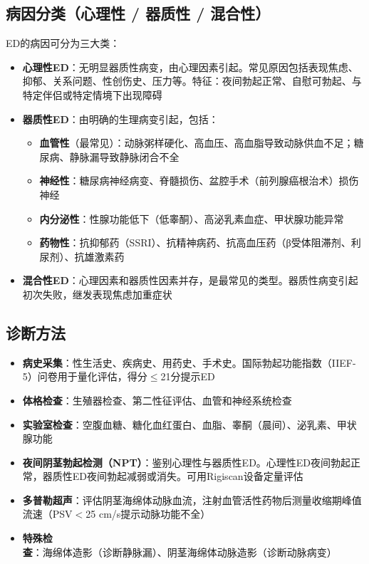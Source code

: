 \subsection{病因分类（心理性 / 器质性 / 混合性）}

ED的病因可分为三大类：

\begin{itemize}[leftmargin=2cm]
	\item \textbf{心理性ED}：无明显器质性病变，由心理因素引起。常见原因包括表现焦虑、抑郁、关系问题、性创伤史、压力等。特征：夜间勃起正常、自慰可勃起、与特定伴侣或特定情境下出现障碍
	\item \textbf{器质性ED}：由明确的生理病变引起，包括：
		\begin{itemize}
		\item \textbf{血管性}（最常见）：动脉粥样硬化、高血压、高血脂导致动脉供血不足；糖尿病、静脉漏导致静脉闭合不全
		\item \textbf{神经性}：糖尿病神经病变、脊髓损伤、盆腔手术（前列腺癌根治术）损伤神经
		\item \textbf{内分泌性}：性腺功能低下（低睾酮）、高泌乳素血症、甲状腺功能异常
		\item \textbf{药物性}：抗抑郁药（SSRI）、抗精神病药、抗高血压药（β受体阻滞剂、利尿剂）、抗雄激素药
		\end{itemize}
	\item \textbf{混合性ED}：心理因素和器质性因素并存，是最常见的类型。器质性病变引起初次失败，继发表现焦虑加重症状
\end{itemize}

\subsection{诊断方法}

\begin{itemize}[leftmargin=2cm]
	\item \textbf{病史采集}：性生活史、疾病史、用药史、手术史。国际勃起功能指数（IIEF-5）问卷用于量化评估，得分$\leq$21分提示ED
	\item \textbf{体格检查}：生殖器检查、第二性征评估、血管和神经系统检查
	\item \textbf{实验室检查}：空腹血糖、糖化血红蛋白、血脂、睾酮（晨间）、泌乳素、甲状腺功能
	\item \textbf{夜间阴茎勃起检测（NPT）}：鉴别心理性与器质性ED。心理性ED夜间勃起正常，器质性ED夜间勃起减弱或消失。可用Rigiscan设备定量评估
	\item \textbf{多普勒超声}：评估阴茎海绵体动脉血流，注射血管活性药物后测量收缩期峰值流速（PSV$<$25 cm/s提示动脉功能不全）
	\item \textbf{特殊检查}：海绵体造影（诊断静脉漏）、阴茎海绵体动脉造影（诊断动脉病变）
\end{itemize}

